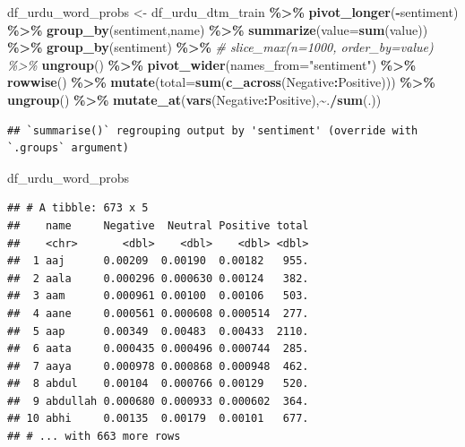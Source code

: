 \documentclass[
]{article}
\newenvironment{Shaded}{\begin{snugshade}}{\end{snugshade}}
\newcommand{\CommentTok}[1]{\textcolor[rgb]{0.56,0.35,0.01}{\textit{#1}}}
\newcommand{\DataTypeTok}[1]{\textcolor[rgb]{0.13,0.29,0.53}{#1}}
\newcommand{\KeywordTok}[1]{\textcolor[rgb]{0.13,0.29,0.53}{\textbf{#1}}}
\newcommand{\NormalTok}[1]{#1}
\newcommand{\OperatorTok}[1]{\textcolor[rgb]{0.81,0.36,0.00}{\textbf{#1}}}
\newcommand{\StringTok}[1]{\textcolor[rgb]{0.31,0.60,0.02}{#1}}
\begin{document}
\begin{Shaded}
\begin{Highlighting}[]
\NormalTok{df\_urdu\_word\_probs \textless{}{-}}\StringTok{ }\NormalTok{df\_urdu\_dtm\_train }\OperatorTok{\%\textgreater{}\%}
\StringTok{  }\KeywordTok{pivot\_longer}\NormalTok{(}\OperatorTok{{-}}\NormalTok{sentiment) }\OperatorTok{\%\textgreater{}\%}
\StringTok{  }\KeywordTok{group\_by}\NormalTok{(sentiment,name) }\OperatorTok{\%\textgreater{}\%}
\StringTok{  }\KeywordTok{summarize}\NormalTok{(}\DataTypeTok{value=}\KeywordTok{sum}\NormalTok{(value)) }\OperatorTok{\%\textgreater{}\%}
\StringTok{  }\KeywordTok{group\_by}\NormalTok{(sentiment) }\OperatorTok{\%\textgreater{}\%}
\StringTok{  }\CommentTok{\# slice\_max(n=1000, order\_by=value) \%\textgreater{}\%}
\StringTok{  }\KeywordTok{ungroup}\NormalTok{() }\OperatorTok{\%\textgreater{}\%}
\StringTok{  }\KeywordTok{pivot\_wider}\NormalTok{(}\DataTypeTok{names\_from=}\StringTok{"sentiment"}\NormalTok{) }\OperatorTok{\%\textgreater{}\%}
\StringTok{  }\KeywordTok{rowwise}\NormalTok{() }\OperatorTok{\%\textgreater{}\%}
\StringTok{  }\KeywordTok{mutate}\NormalTok{(}\DataTypeTok{total=}\KeywordTok{sum}\NormalTok{(}\KeywordTok{c\_across}\NormalTok{(Negative}\OperatorTok{:}\NormalTok{Positive))) }\OperatorTok{\%\textgreater{}\%}
\StringTok{  }\KeywordTok{ungroup}\NormalTok{() }\OperatorTok{\%\textgreater{}\%}
\StringTok{  }\KeywordTok{mutate\_at}\NormalTok{(}\KeywordTok{vars}\NormalTok{(Negative}\OperatorTok{:}\NormalTok{Positive),}\OperatorTok{\textasciitilde{}}\NormalTok{.}\OperatorTok{/}\KeywordTok{sum}\NormalTok{(.))}
\end{Highlighting}
\end{Shaded}

\begin{verbatim}
## `summarise()` regrouping output by 'sentiment' (override with `.groups` argument)
\end{verbatim}

\begin{Shaded}
\begin{Highlighting}[]
\NormalTok{df\_urdu\_word\_probs}
\end{Highlighting}
\end{Shaded}

\begin{verbatim}
## # A tibble: 673 x 5
##    name     Negative  Neutral Positive total
##    <chr>       <dbl>    <dbl>    <dbl> <dbl>
##  1 aaj      0.00209  0.00190  0.00182   955.
##  2 aala     0.000296 0.000630 0.00124   382.
##  3 aam      0.000961 0.00100  0.00106   503.
##  4 aane     0.000561 0.000608 0.000514  277.
##  5 aap      0.00349  0.00483  0.00433  2110.
##  6 aata     0.000435 0.000496 0.000744  285.
##  7 aaya     0.000978 0.000868 0.000948  462.
##  8 abdul    0.00104  0.000766 0.00129   520.
##  9 abdullah 0.000680 0.000933 0.000602  364.
## 10 abhi     0.00135  0.00179  0.00101   677.
## # ... with 663 more rows
\end{verbatim}
\end{document}
